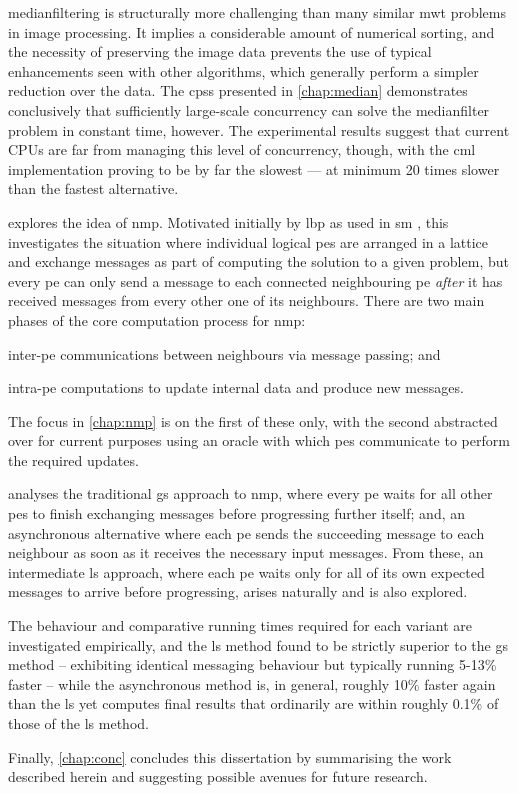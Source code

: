 \Gls{medianfilter}ing is structurally more challenging than many similar \gls{mwt} problems in image processing.  It implies a considerable amount of numerical sorting, and the necessity of preserving the image data prevents the use of typical enhancements seen with other algorithms, which generally perform a simpler reduction over the data.  The \glspl{cps} presented in \cref{chap:median} demonstrates conclusively that sufficiently large-scale concurrency can solve the \gls{medianfilter} problem in constant time, however.  The experimental results suggest that current CPUs are far from managing this level of concurrency, though, with the \gls{cml} implementation proving to be by far the slowest --- at minimum 20 times slower than the fastest alternative.

 explores the idea of \gls{nmp}.  Motivated initially by \gls{lbp} \cite{Sun2003,Felzenszwalb2006,Felzenszwalb2011} as used in \gls{sm} \cite{Sinha2020,Tippetts2016,Scharstein2002}, this  investigates the situation where individual logical \glspl{pe} are arranged in a lattice and exchange messages as part of computing the solution to a given problem, but every \gls{pe} can only send a message to each connected neighbouring \gls{pe} \emph{after} it has received messages from every other one of its neighbours.  There are two main phases of the core computation process for \gls{nmp}:
\begin{inparaenum}[a)]
\item inter-\gls{pe} communications between neighbours via message passing; and
\item intra-\gls{pe} computations to update internal data and produce new messages.
\end{inparaenum}  The focus in \cref{chap:nmp} is on the first of these only, with the second abstracted over for current purposes using an oracle with which \glspl{pe} communicate to perform the required updates.

 analyses the traditional \gls{gs} approach to \gls{nmp}, where every \gls{pe} waits for all other \glspl{pe} to finish exchanging messages before progressing further itself; and, an asynchronous alternative where each \gls{pe} sends the succeeding message to each neighbour as soon as it receives the necessary input messages.  From these, an intermediate \gls{ls} approach, where each \gls{pe} waits only for all of its own expected messages to arrive before progressing, arises naturally and is also explored.

The behaviour and comparative running times required for each variant are investigated empirically, and the \gls{ls} method found to be strictly superior to the \gls{gs} method -- exhibiting identical messaging behaviour but typically running 5-13\% faster -- while the asynchronous method is, in general, roughly 10\% faster again than the \gls{ls} yet computes final results that ordinarily are within roughly 0.1\% of those of the \gls{ls} method.

Finally, \cref{chap:conc} concludes this dissertation by summarising the work described herein and suggesting possible avenues for future research.